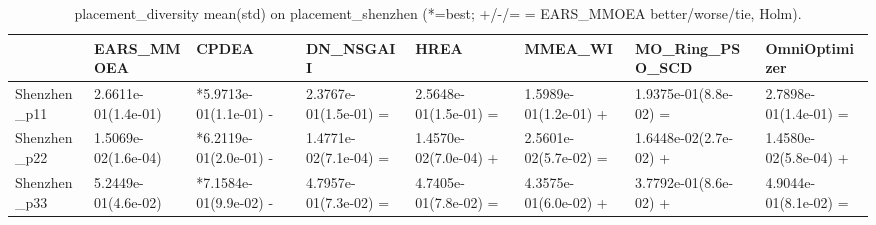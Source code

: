 \begin{table}[t]
\centering
\caption{placement_diversity mean(std) on placement_shenzhen (*=best; +/-/= = EARS_MMOEA better/worse/tie, Holm).}
\label{tab:placement_shenzhen_placement_diversity}
\begin{tabular}{llllllll}
\toprule
 & EARS\_MMOEA & CPDEA & DN\_NSGAII & HREA & MMEA\_WI & MO\_Ring\_PSO\_SCD & OmniOptimizer \\
\midrule
Shenzhen\_p11 & 2.6611e-01(1.4e-01) & *5.9713e-01(1.1e-01) - & 2.3767e-01(1.5e-01) = & 2.5648e-01(1.5e-01) = & 1.5989e-01(1.2e-01) + & 1.9375e-01(8.8e-02) = & 2.7898e-01(1.4e-01) = \\
Shenzhen\_p22 & 1.5069e-02(1.6e-04) & *6.2119e-01(2.0e-01) - & 1.4771e-02(7.1e-04) = & 1.4570e-02(7.0e-04) + & 2.5601e-02(5.7e-02) = & 1.6448e-02(2.7e-02) + & 1.4580e-02(5.8e-04) + \\
Shenzhen\_p33 & 5.2449e-01(4.6e-02) & *7.1584e-01(9.9e-02) - & 4.7957e-01(7.3e-02) = & 4.7405e-01(7.8e-02) = & 4.3575e-01(6.0e-02) + & 3.7792e-01(8.6e-02) + & 4.9044e-01(8.1e-02) = \\
\bottomrule
\end{tabular}
\end{table}
